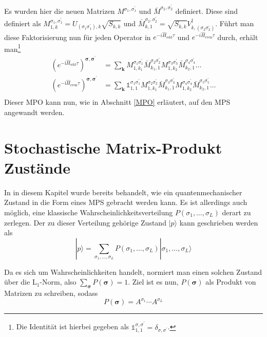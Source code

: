 \documentclass[10pt,a4paper]{report}
\newcommand{\SumIndex}{\sigma_1,\ldots,\sigma_L}
\begin{document}
Es wurden hier die neuen Matrizen $M^{\sigma_1,\sigma_1^{\prime}}$ und $\bar{M}^{\sigma_2,\sigma_2^{\prime}}$ definiert. Diese sind definiert als $M_{1,k}^{\sigma_1,\sigma_1^{\prime}}=U_{(\sigma_1 \sigma_1^\prime),k}\sqrt{S_{k,k}}$ und $\bar{M}_{k,1}^{\sigma_2,\sigma_2^{\prime}}=\sqrt{S_{k,k}}V_{k,(\sigma_2 \sigma_2^\prime)}^\dagger$. Führt man diese Faktorisierung nun für jeden Operator in $e^{-i\hat{H}_{\text{odd}}\tau}$ und $e^{-i\hat{H}_{\text{even}}\tau}$ durch, erhält man\footnote{Die Identität ist hierbei gegeben als $\mathbb{1}_{1,1}^{\sigma,\sigma^{\prime}}=\delta_{\sigma,\sigma^{\prime}}$.}
\begin{equation}
\begin{split}
(e^{-\text{i}\hat{H}_{\text{odd}}\tau})^{\bm{\sigma},\bm{\sigma^\prime}}&=\sum_{\bm{k}}M_{1,k_1}^{\sigma_1 \sigma_1^\prime} \bar{M}_{k_1,1}^{\sigma_2 \sigma_2^\prime}M_{1,k_2}^{\sigma_3 \sigma_3^\prime} \bar{M}_{k_2,1}^{\sigma_4 \sigma_4^\prime}\ldots\\
(e^{-\text{i}\hat{H}_{\text{even}}\tau})^{\bm{\sigma},\bm{\sigma^\prime}}&=\sum_{\bm{k}}\mathbb{1}_{1,1}^{\sigma_1 \sigma_1^\prime} M_{1,k_1}^{\sigma_2 \sigma_2^\prime}\bar{M}_{k_1,1}^{\sigma_3 \sigma_3^\prime} M_{1,k_2}^{\sigma_4 \sigma_4^\prime}\bar{M}_{k_2,1}^{\sigma_5 \sigma_5^\prime}\ldots\\
\end{split}
\end{equation}
Dieser MPO kann nun, wie in Abschnitt \ref{MPO} erläutert, auf den MPS angewandt werden.

\section{Stochastische Matrix-Produkt Zustände}
In in diesem Kapitel wurde bereits behandelt, wie ein quantenmechanischer Zustand in die Form eines MPS gebracht werden kann. Es ist allerdings auch möglich, eine klassische Wahrscheinlichkeitsverteilung $P(\SumIndex)$ derart zu zerlegen. Der zu dieser Verteilung gehörige Zustand $|p\rangle$ kann geschrieben werden als
\begin{equation}
|p\rangle=\sum_{\SumIndex}P(\SumIndex)|\SumIndex\rangle
\end{equation}

Da es sich um Wahrscheinlichkeiten handelt, normiert man einen solchen Zustand über die $\text{L}_1$-Norm, also $\sum_{\bm{\sigma}}P(\bm{\sigma})=1$. Ziel ist es nun, $P(\bm{\sigma})$ als Produkt von Matrizen zu schreiben, sodass
\begin{equation}
P(\bm{\sigma})=A^{\sigma_1}\cdots A^{\sigma_L}
\end{equation}
\end{document}
